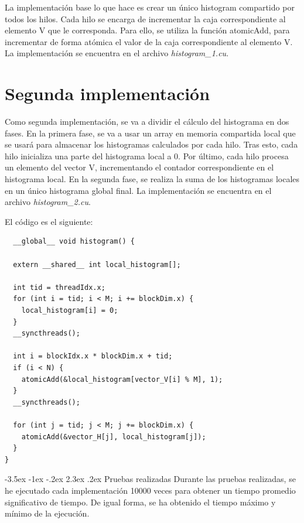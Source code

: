 \documentclass[11pt]{report}
\makeatletter
\renewcommand\chapter{\@startsection{chapter}{0}{\z@}%
    {-3.5ex \@plus -1ex \@minus -.2ex}%
    {2.3ex \@plus.2ex}%
    {\normalfont\Large\bfseries}}
\makeatother
\begin{document}
La implementación base lo que hace es crear un único histogram compartido por todos
los hilos. Cada hilo se encarga de incrementar la caja correspondiente al elemento
V que le corresponda. Para ello, se utiliza la función atomicAdd, para incrementar
de forma atómica el valor de la caja correspondiente al elemento V. La implementación
se encuentra en el archivo \textit{histogram\_1.cu}.

\section{Segunda implementación}
Como segunda implementación, se va a dividir el cálculo del histograma en dos fases.
En la primera fase, se va a usar un array en memoria compartida local que se usará para
almacenar los histogramas calculados por cada hilo. Tras esto, cada hilo inicializa una parte 
del histograma local a 0. Por último, cada hilo procesa un elemento del vector V, incrementando
el contador correspondiente en el histograma local. En la segunda fase, se realiza la suma de
los histogramas locales en un único histograma global final. La implementación se encuentra
en el archivo \textit{histogram\_2.cu}.

El código es el siguiente:
\begin{lstlisting}
  __global__ void histogram() {

  extern __shared__ int local_histogram[];

  int tid = threadIdx.x;
  for (int i = tid; i < M; i += blockDim.x) {
    local_histogram[i] = 0;
  }
  __syncthreads();

  int i = blockIdx.x * blockDim.x + tid;
  if (i < N) {
    atomicAdd(&local_histogram[vector_V[i] % M], 1);
  }
  __syncthreads();

  for (int j = tid; j < M; j += blockDim.x) {
    atomicAdd(&vector_H[j], local_histogram[j]);
  }
}
\end{lstlisting}

\chapter{Pruebas realizadas}
Durante las pruebas realizadas, se he ejecutado cada implementación 10000 veces para 
obtener un tiempo promedio significativo de tiempo. De igual forma, se ha obtenido el tiempo
máximo y mínimo de la ejecución. 
\end{document}
